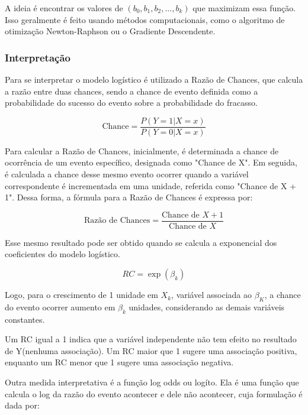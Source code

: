 A ideia é encontrar os valores de $(b_0, b_1, b_2, ..., b_k)$ que maximizam essa função. Isso geralmente é feito usando métodos computacionais, 
como o algoritmo de otimização Newton-Raphson ou o Gradiente Descendente.

\subsubsection{Interpretação}


Para se interpretar o modelo logístico é utilizado a Razão de Chances, que calcula a razão entre duas chances, sendo a chance
de evento definida como a probabilidade do sucesso do evento sobre a probabilidade do fracasso.

\begin{equation}
  \text{Chance} =  \frac{P(Y=1|X=x)}{P(Y=0|X=x)}
\end{equation}

Para calcular a Razão de Chances, inicialmente, é determinada a chance de ocorrência de um evento específico,
designada como "Chance de X". Em seguida, é calculada a chance desse mesmo evento ocorrer quando a variável 
correspondente é incrementada em uma unidade, referida como "Chance de X + 1". 
Dessa forma, a fórmula para a Razão de Chances é expressa por:

\begin{equation}
  \text{Razão de Chances} =  \frac{\text{Chance de } X + 1}{\text{Chance de } X}
\end{equation}


Esse mesmo resultado pode ser obtido quando se calcula a exponencial dos coeficientes do modelo logístico.

\begin{equation}
  RC = \exp{(\beta_k)}
\end{equation}

Logo, para o crescimento de 1 unidade em $X_k$, variável associada ao $\beta_K$, a chance do evento ocorrer aumento em $\beta_k$ unidades,
considerando as demais variáveis constantes.

Um RC igual a 1 indica que a variável independente não tem efeito no resultado de Y(nenhuma associação).
Um RC maior que 1 sugere uma associação positiva, enquanto um RC menor que 1 sugere uma associação negativa.

Outra medida interpretativa é a função log odds ou logíto. Ela é uma função que calcula o log da 
razão do evento acontecer e dele não acontecer, cuja formulação é dada por:

